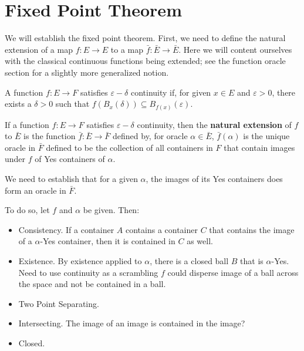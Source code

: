\documentclass[12pt]{article}
\begin{document}
\section{Fixed Point Theorem}

We will establish the fixed point theorem. First, we need to define the natural extension of a map $f: E \to E$ to a map $\bar{f} : \bar{E} \to \bar{E}$. Here we will content ourselves with the classical continuous functions being extended; see the function oracle section for a slightly more generalized notion. 

\begin{definition}
    A function $f: E \to F$ satisfies $\varepsilon-\delta$ continuity if, for given $x \in E$ and $\varepsilon > 0$, there exists a $\delta > 0$ such that $f(B_{x} (\delta)) \subseteq B_{f(x)} (\varepsilon)$.
\end{definition}

\begin{definition}
If a function $f:E \to F$ satisfies $\varepsilon-\delta$ continuity, then the \textbf{natural extension} of $f$ to $\bar{E}$ is the function $\bar{f}:\bar{E} \to \bar{F}$ defined by, for oracle $\alpha \in \bar{E}$, $\bar{f}(\alpha)$ is the unique oracle in $\bar{F}$ defined to be the collection of all containers in $F$ that contain images under $f$ of Yes containers of $\alpha$. 
\end{definition}

We need to establish that for a given $\alpha$, the images of its Yes containers does form an oracle in $\bar{F}$. 

To do so, let $f$ and $\alpha$ be given. Then: 

\begin{itemize}
    \item Consistency. If a container $A$ contains a container $C$ that contains the image of a $\alpha$-Yes container, then it is contained in $C$ as well.
    \item Existence. By existence applied to $\alpha$, there is a closed ball $B$ that is $\alpha$-Yes. Need to use continuity as a scrambling $f$ could disperse image of a ball across the space and not be contained in a ball. 
    \item Two Point Separating.
    \item Intersecting. The image of an image is contained in the image? 
    \item Closed. 
\end{itemize}
\end{document}

